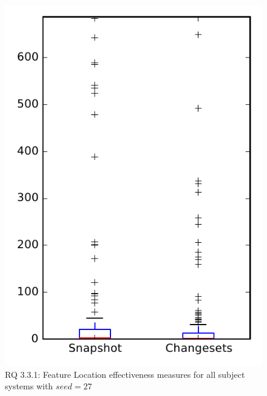 
\begin{figure}
\centering
\includegraphics[height=0.4\textheight]{figures/flt_seed/rq1_overview_27}
\caption{RQ 3.3.1: Feature Location effectiveness measures for all subject systems with $seed=27$}
\label{fig:flt_seed:rq1:overview}
\end{figure}
